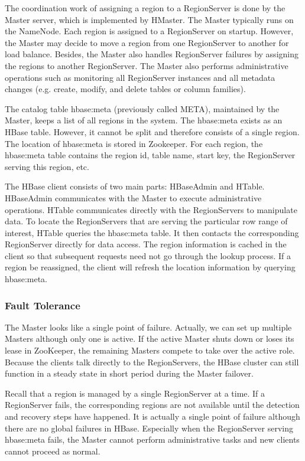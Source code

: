 \documentclass[12pt]{book}
\begin{document}
The coordination work of assigning a region to a RegionServer is done by the Master server, which is implemented by HMaster. The Master typically runs on the NameNode. Each region is assigned to a RegionServer on startup. However, the Master may decide to move a region from one RegionServer to another for load balance. Besides, the Master also handles RegionServer failures by assigning the regions to another RegionServer.  The Master also performs administrative operations such as monitoring all RegionServer instances and all metadata changes (e.g. create, modify, and delete tables or column families).

The catalog table hbase:meta (previously called META), maintained by the Master, keeps a list of all regions in the system. The hbase:meta exists as an HBase table. However, it cannot be split and therefore consists of a single region. The location of hbase:meta is stored in Zookeeper. For each region, the hbase:meta table contains the region id, table name, start key, the RegionServer serving this region, etc.

The HBase client consists of two main parts: HBaseAdmin and HTable. HBaseAdmin communicates with the Master to execute administrative operations. HTable communicates directly with the RegionServers to manipulate data. To locate the RegionServers that are serving the particular row range of interest, HTable queries the hbase:meta table. It then contacts the corresponding RegionServer directly for data access. The region information is cached in the client so that subsequent requests need not go through the lookup process. If a region be reassigned, the client will refresh the location information by querying hbase:meta.

\subsubsection{Fault Tolerance}

The Master looks like a single point of failure. Actually, we can set up multiple Masters although only one is active. If the active Master shuts down or loses its lease in ZooKeeper, the remaining Masters compete to take over the active role. Because the clients talk directly to the RegionServers, the HBase cluster can still function in a steady state in short period during the Master failover.

Recall that a region is managed by a single RegionServer at a time. If a RegionServer fails, the corresponding regions are not available until the detection and recovery steps have happened. It is actually a single point of failure although there are no global failures in HBase. Especially when the RegionServer serving hbase:meta fails, the Master cannot perform administrative tasks and new clients cannot proceed as normal.
\end{document}

